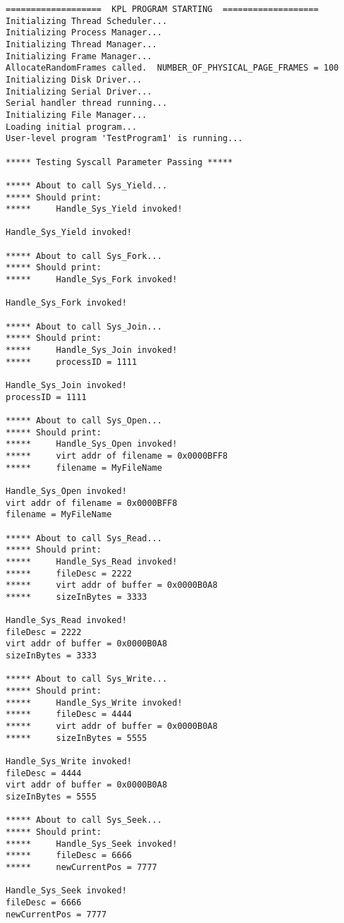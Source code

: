 \documentclass[12pt]{article}
\begin{document}
{\small
 
\begin{verbatim}
===================  KPL PROGRAM STARTING  ===================
Initializing Thread Scheduler...
Initializing Process Manager...
Initializing Thread Manager...
Initializing Frame Manager...
AllocateRandomFrames called.  NUMBER_OF_PHYSICAL_PAGE_FRAMES = 100
Initializing Disk Driver...
Initializing Serial Driver...
Serial handler thread running...
Initializing File Manager...
Loading initial program...
User-level program 'TestProgram1' is running...

***** Testing Syscall Parameter Passing *****

***** About to call Sys_Yield...
***** Should print:
*****     Handle_Sys_Yield invoked!

Handle_Sys_Yield invoked!

***** About to call Sys_Fork...
***** Should print:
*****     Handle_Sys_Fork invoked!

Handle_Sys_Fork invoked!

***** About to call Sys_Join...
***** Should print:
*****     Handle_Sys_Join invoked!
*****     processID = 1111

Handle_Sys_Join invoked!
processID = 1111

***** About to call Sys_Open...
***** Should print:
*****     Handle_Sys_Open invoked!
*****     virt addr of filename = 0x0000BFF8
*****     filename = MyFileName

Handle_Sys_Open invoked!
virt addr of filename = 0x0000BFF8
filename = MyFileName

***** About to call Sys_Read...
***** Should print:
*****     Handle_Sys_Read invoked!
*****     fileDesc = 2222
*****     virt addr of buffer = 0x0000B0A8
*****     sizeInBytes = 3333

Handle_Sys_Read invoked!
fileDesc = 2222
virt addr of buffer = 0x0000B0A8
sizeInBytes = 3333

***** About to call Sys_Write...
***** Should print:
*****     Handle_Sys_Write invoked!
*****     fileDesc = 4444
*****     virt addr of buffer = 0x0000B0A8
*****     sizeInBytes = 5555

Handle_Sys_Write invoked!
fileDesc = 4444
virt addr of buffer = 0x0000B0A8
sizeInBytes = 5555

***** About to call Sys_Seek...
***** Should print:
*****     Handle_Sys_Seek invoked!
*****     fileDesc = 6666
*****     newCurrentPos = 7777

Handle_Sys_Seek invoked!
fileDesc = 6666
newCurrentPos = 7777


\end{verbatim}}
\end{document}
